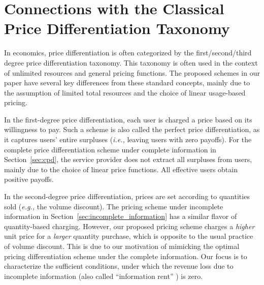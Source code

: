 \documentclass[twocolumn,10pt,twosided]{IEEEtran}
\newcommand{\eg}{\emph{e.g., }}
\newcommand{\ie}{\emph{i.e., }}
\begin{document}


\section{Connections with the Classical Price Differentiation Taxonomy}

In economics, price differentiation is often categorized by the first/second/third degree price differentiation taxonomy\cite{pashigian1995price}. This taxonomy is often used in the context of unlimited resources and general pricing functions. The proposed schemes in our paper have several key differences from these standard concepts, mainly due to the assumption of limited total resources and the choice of linear usage-based pricing.


In the first-degree price differentiation, each user is charged a price based on its willingness to pay. Such a scheme is also called the perfect price differentiation, as it captures users' entire surpluses (\ie leaving users with zero payoffs). For the complete price differentiation scheme under complete information in Section~\ref{sec:cpd}, the service provider does not extract all surpluses from users, mainly due to the choice of linear price functions. All effective users obtain positive payoffs.

In the second-degree price differentiation, prices are set according to quantities sold (\eg the volume discount). The pricing scheme under incomplete information in Section~\ref{sec:incomplete_information} has a similar flavor of quantity-based charging. However, our proposed pricing scheme charges a \emph{higher} unit price for a \emph{larger} quantity purchase, which is opposite to the usual practice of volume discount. This is due to our motivation of mimicking the optimal pricing differentiation scheme under the complete information. Our focus is to characterize the sufficient conditions, under which the revenue loss due to incomplete information (also called ``information rent'' \cite{mussa1978monopoly, stokey1979intertemporal, maskin1984monopoly,mas1995microeconomic}) is zero.
\end{document}
